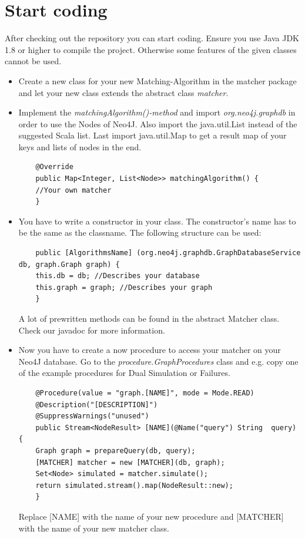 \section{Start coding}\label{sec:startProgrammingNew}
After checking out the repository you can start coding. Ensure you use Java JDK 1.8 or higher to compile the project. Otherwise some features of the given classes cannot be used.
\begin{itemize}
	\item Create a new class for your new Matching-Algorithm in the matcher package and let your new class extends the abstract class \textit{matcher}.
	\item Implement the \textit{matchingAlgorithm()-method} and import \textit{org.neo4j.graphdb} in order to use the Nodes of Neo4J. Also import the java.util.List instead of the suggested Scala list. Last import java.util.Map to get a result map of your keys and lists of nodes in the end.
	\lstset{language=Java}
	\begin{lstlisting} 
	@Override
	public Map<Integer, List<Node>> matchingAlgorithm() {
	//Your own matcher
	}
	\end{lstlisting} 
	
	\item You have to write a constructor in your class. The constructor's name has to be the same as the classname. The following structure can be used: 
	\lstset{language=Java}
	\begin{lstlisting}
	public [AlgorithmsName] (org.neo4j.graphdb.GraphDatabaseService db, graph.Graph graph) {
	this.db = db; //Describes your database
	this.graph = graph; //Describes your graph
	}
	\end{lstlisting}
	A lot of prewritten methods can be found in the abstract \glqq Matcher\grqq{} class. Check our javadoc for more information.
	\item Now you have to create a now procedure to access your matcher on your Neo4J database. Go to the \textit{procedure.GraphProcedures} class and e.g. copy one of the example procedures for Dual Simulation or Failures.
	\begin{lstlisting}
	@Procedure(value = "graph.[NAME]", mode = Mode.READ)
	@Description("[DESCRIPTION]")
	@SuppressWarnings("unused")
	public Stream<NodeResult> [NAME](@Name("query") String 	query) {
	Graph graph = prepareQuery(db, query);
	[MATCHER] matcher = new [MATCHER](db, graph);
	Set<Node> simulated = matcher.simulate();
	return simulated.stream().map(NodeResult::new);
	}
	\end{lstlisting} 
	Replace [NAME] with the name of your new procedure and [MATCHER] with the name of your new matcher class.
\end{itemize}

